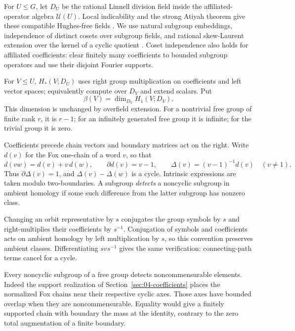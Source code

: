 \begin{notation}\label{row:coefficients}
For \(U\leq G\), let \(D_U\) be the rational Linnell division field
inside the affiliated-operator algebra \(\mathcal U(U)\).
Local indicability and the strong Atiyah theorem give these compatible
Hughes-free fields
\cite{Brodskii1984,Howie1982,JaikinLopezAlvarez2020}.
We use natural subgroup embeddings, independence of distinct cosets
over subgroup fields, and rational skew-Laurent extension over the
kernel of a cyclic quotient
\cite[Section~2.3 and Proposition~2.2]{JaikinUniversality2021}.
Coset independence also holds for
affiliated coefficients: clear finitely many coefficients to bounded
subgroup operators and use their disjoint Fourier supports.

For \(V\leq U\), \(H_*(V;D_U)\) uses right group multiplication on
coefficients and left vector spaces; equivalently compute over
\(D_V\) and extend scalars. Put
\[
 \beta(V)=\dim_{D_V}H_1(V;D_V).
\]
This dimension is unchanged by overfield extension. For a nontrivial
free group of finite rank \(r\), it is \(r-1\); for an infinitely
generated free group it is infinite; for the trivial group it is zero.

Coefficients precede chain vectors and boundary matrices act on the
right. Write \(d(v)\) for the Fox one-chain of a word \(v\), so that
\[
 d(vw)=d(v)+v\,d(w),\qquad \partial d(v)=v-1,\qquad
 \Delta(v)=(v-1)^{-1}d(v)\quad(v\neq1).
\]
Thus \(\partial\Delta(v)=1\), and \(\Delta(v)-\Delta(w)\) is a cycle.
Intrinsic expressions are taken modulo two-boundaries.
A subgroup \emph{detects} a noncyclic subgroup in ambient homology
if some such difference from the latter subgroup has nonzero class.

Changing an orbit representative by \(s\) conjugates the group
symbols by \(s\) and right-multiplies their coefficients by \(s^{-1}\).
Conjugation of symbols and coefficients acts on ambient homology by
left multiplication by \(s\), so this convention preserves ambient
classes. Differentiating \(svs^{-1}\) gives the same verification:
connecting-path terms cancel for a cycle.
\end{notation}

Every noncyclic subgroup of a free group detects noncommensurable
elements. Indeed the support realization of
Section~\ref{sec:04-coefficients} places the normalized Fox chains
near their respective cyclic axes. Those axes have bounded overlap
when they are noncommensurable. Equality would give a finitely
supported chain with boundary the mass at the identity, contrary
to the zero total augmentation of a finite boundary.

